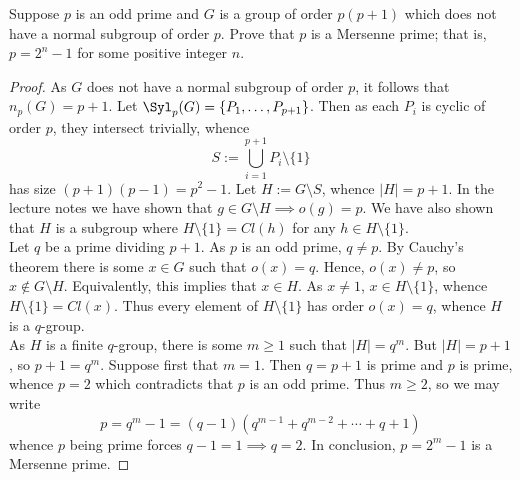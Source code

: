 \documentclass[12pt]{article}
\begin{document}
\begin{homeworkProblem}
  Suppose $p$ is an odd prime and $G$ is a group of order $p(p+1)$ which does not have a normal subgroup of order $p$. Prove that $p$ is a Mersenne prime; that is, $p = 2^n - 1$ for some positive integer $n$.  


  \begin{proof}
    As $ G  $ does not have a normal subgroup of order $ p $, it follows that $ n_{p}(G) = p+1 $. Let $ \Syl_{p}(G) = \{P_{1},\ldots,P_{p+1}\} $. Then as each $ P_{i} $ is cyclic of order $ p $, they intersect trivially, whence 
    \[
      S:=\bigcup_{i=1}^{p+1}P_{i}\setminus \{1\}
    \]
    has size $ (p+1)(p-1) = p^{2}-1 $. Let $ H:=G\setminus S $, whence $ |H|=p+1 $. In the lecture notes we have shown that $ g\in G\setminus H \implies o(g)=p $. We have also shown that $ H $ is a subgroup where $ H \setminus \{1\} = Cl(h) $ for any $ h\in H\setminus \{1\} $.\\

    Let $ q $ be a prime dividing $ p+1 $. As $ p $ is an odd prime, $ q\neq p $. By Cauchy's theorem there is some $ x\in G $ such that $ o(x) = q $. Hence, $ o(x)\neq p $, so $ x\not\in G\setminus H $. Equivalently, this implies that $ x\in H $. As $ x\neq 1 $, $ x\in H\setminus \{1\} $, whence $ H\setminus \{1\} = Cl(x) $. Thus every element of $ H\setminus\{1\} $ has order $ o(x) = q $, whence $ H $ is a $ q $-group.\\

    As $ H $ is a finite $ q $-group, there is some $ m\geq 1 $ such that $ |H| = q^{m} $. But $ |H| = p+1 $, so $ p+1=q^{m} $. Suppose first that $ m=1 $. Then $ q=p+1 $ is prime and $ p $ is prime, whence $ p=2 $ which contradicts that $ p $ is an odd prime. Thus $ m\geq 2 $, so we may write
    \[
      p = q^{m}-1 = (q-1)(q^{m-1}+q^{m-2}+\cdots + q +1)
    \]
    whence $ p $ being prime forces $ q-1=1\implies q = 2 $. In conclusion, $ p = 2^{m}-1 $ is a Mersenne prime.
  \end{proof}
\end{homeworkProblem}
\end{document}
